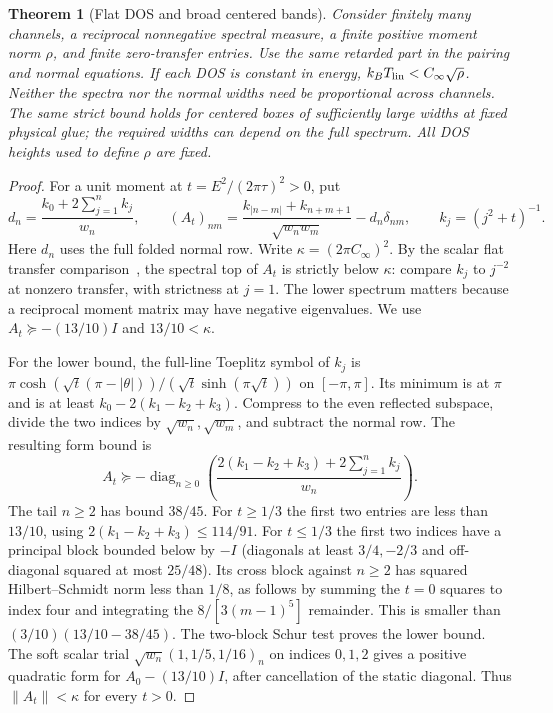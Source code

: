\documentclass[11pt]{article}
\newtheorem{theorem}{Theorem}
\newcommand{\Cinf}{C_\infty}
\newcommand{\Tlin}{T_{\rm lin}}
\begin{document}
\begin{theorem}[Flat DOS and broad centered bands]\label{thm:flat}
Consider finitely many channels, a reciprocal nonnegative spectral measure, a finite positive moment norm $\rho$, and finite zero-transfer entries. Use the same retarded part in the pairing and normal equations. If each DOS is constant in energy, $k_B\Tlin<\Cinf\sqrt{\rho}$. Neither the spectra nor the normal widths need be proportional across channels. The same strict bound holds for centered boxes of sufficiently large widths at fixed physical glue; the required widths can depend on the full spectrum. All DOS heights used to define $\rho$ are fixed.
\end{theorem}
\begin{proof}
For a unit moment at $t=E^2/(2\pi\tau)^2>0$, put
\[
 d_n=\frac{k_0+2\sum_{j=1}^n k_j}{w_n},\qquad
 (A_t)_{nm}=\frac{k_{|n-m|}+k_{n+m+1}}{\sqrt{w_nw_m}}-d_n\delta_{nm},
 \qquad k_j=(j^2+t)^{-1}.
\]
Here $d_n$ uses the full folded normal row. Write $\kappa=(2\pi\Cinf)^2$. By the scalar flat transfer comparison~\cite{kondratev,rens,finite}, the spectral top of $A_t$ is strictly below $\kappa$: compare $k_j$ to $j^{-2}$ at nonzero transfer, with strictness at $j=1$. The lower spectrum matters because a reciprocal moment matrix may have negative eigenvalues. We use $A_t\succeq-(13/10)I$ and $13/10<\kappa$.

For the lower bound, the full-line Toeplitz symbol of $k_j$ is $\pi\cosh(\sqrt t(\pi-|\theta|))/(\sqrt t\sinh(\pi\sqrt t))$ on $[-\pi,\pi]$. Its minimum is at $\pi$ and is at least $k_0-2(k_1-k_2+k_3)$. Compress to the even reflected subspace, divide the two indices by $\sqrt{w_n},\sqrt{w_m}$, and subtract the normal row. The resulting form bound is
\[
 A_t\succeq-\operatorname{diag}_{n\ge0}
 \left(\frac{2(k_1-k_2+k_3)+2\sum_{j=1}^n k_j}{w_n}\right).
\]
The tail $n\ge2$ has bound $38/45$. For $t\ge1/3$ the first two entries are less than $13/10$, using $2(k_1-k_2+k_3)\le114/91$. For $t\le1/3$ the first two indices have a principal block bounded below by $-I$ (diagonals at least $3/4,-2/3$ and off-diagonal squared at most $25/48$). Its cross block against $n\ge2$ has squared Hilbert--Schmidt norm less than $1/8$, as follows by summing the $t=0$ squares to index four and integrating the $8/[3(m-1)^5]$ remainder. This is smaller than $(3/10)(13/10-38/45)$. The two-block Schur test proves the lower bound. The soft scalar trial $\sqrt{w_n}(1,1/5,1/16)_n$ on indices $0,1,2$ gives a positive quadratic form for $A_0-(13/10)I$, after cancellation of the static diagonal. Thus $\|A_t\|<\kappa$ for every $t>0$.


\end{proof}
\end{document}
